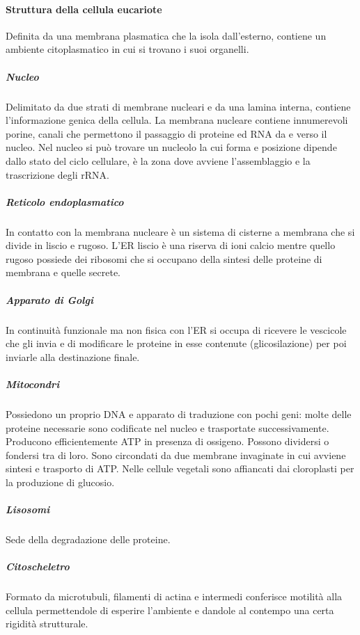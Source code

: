\paragraph{Struttura della cellula eucariote}
Definita da una membrana plasmatica che la isola dall'esterno, contiene un ambiente citoplasmatico in cui si trovano i suoi organelli.
\subparagraph{Nucleo}
Delimitato da due strati di membrane nucleari e da una lamina interna, contiene l'informazione genica della cellula. La membrana nucleare contiene innumerevoli porine, 
canali che permettono il passaggio di proteine ed RNA da e verso il nucleo. Nel nucleo si pu\`o trovare un nucleolo la cui forma e posizione dipende dallo stato del ciclo cellulare, 
\`e la zona dove avviene l'assemblaggio e la trascrizione degli rRNA.
\subparagraph{Reticolo endoplasmatico}
In contatto con la membrana nucleare \`e un sistema di cisterne a membrana che si divide in liscio e rugoso. L'ER liscio \`e una riserva di ioni calcio mentre quello rugoso possiede
dei ribosomi che si occupano della sintesi delle proteine di membrana e quelle secrete.
\subparagraph{Apparato di Golgi}
In continuit\`a funzionale ma non fisica con l'ER si occupa di ricevere le vescicole che gli invia e di modificare le proteine in esse contenute (glicosilazione) per poi inviarle alla
destinazione finale. 
\subparagraph{Mitocondri}
Possiedono un proprio DNA e apparato di traduzione con pochi geni: molte delle proteine necessarie sono codificate nel nucleo e trasportate successivamente. Producono efficientemente
ATP in presenza di ossigeno. Possono dividersi o fondersi tra di loro. Sono circondati da due membrane invaginate in cui avviene sintesi e trasporto di ATP. Nelle cellule vegetali sono
affiancati dai cloroplasti per la produzione di glucosio.
\subparagraph{Lisosomi} 
Sede della degradazione delle proteine.
\subparagraph{Citoscheletro} 
Formato da microtubuli, filamenti di actina e intermedi conferisce motilit\`a alla cellula permettendole di esperire l'ambiente e dandole al contempo una certa rigidit\`a strutturale. 
